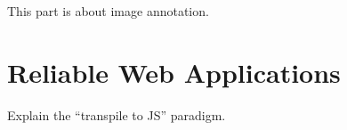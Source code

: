 This part is about image annotation.





\chapter{Reliable Web Applications}%
\label{cha:reliable_web_applications}

Explain the ``transpile to JS'' paradigm.


